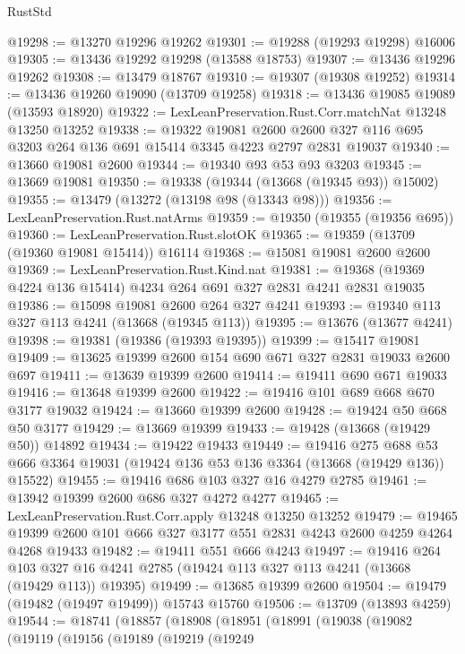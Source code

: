 \begin{lexlean}{RustStd}
\begin{coremodule}
@19298 := @13270 @19296 @19262
@19301 := @19288 (@19293 @19298) @16006
@19305 := @13436 @19292 @19298 (@13588 @18753)
@19307 := @13436 @19296 @19262
@19308 := @13479 @18767
@19310 := @19307 (@19308 @19252)
@19314 := @13436 @19260 @19090 (@13709 @19258)
@19318 := @13436 @19085 @19089 (@13593 @18920)
@19322 := LexLeanPreservation.Rust.Corr.matchNat @13248 @13250 @13252
@19338 := @19322
    @19081
    @2600
    @2600
    @327
    @116
    @695
    @3203
    @264
    @136
    @691
    @15414
    @3345
    @4223
    @2797
    @2831
    @19037
@19340 := @13660 @19081 @2600
@19344 := @19340 @93 @53 @93 @3203
@19345 := @13669 @19081
@19350 := @19338 (@19344 (@13668 (@19345 @93)) @15002)
@19355 := @13479 (@13272 (@13198 @98 (@13343 @98)))
@19356 := LexLeanPreservation.Rust.natArms
@19359 := @19350 (@19355 (@19356 @695))
@19360 := LexLeanPreservation.Rust.slotOK
@19365 := @19359 (@13709 (@19360 @19081 @15414)) @16114
@19368 := @15081 @19081 @2600 @2600
@19369 := LexLeanPreservation.Rust.Kind.nat
@19381 := @19368 (@19369 @4224 @136 @15414) @4234 @264 @691 @327 @2831 @4241 @2831 @19035
@19386 := @15098 @19081 @2600 @264 @327 @4241
@19393 := @19340 @113 @327 @113 @4241 (@13668 (@19345 @113))
@19395 := @13676 (@13677 @4241)
@19398 := @19381 (@19386 (@19393 @19395))
@19399 := @15417 @19081
@19409 := @13625 @19399 @2600 @154 @690 @671 @327 @2831 @19033 @2600 @697
@19411 := @13639 @19399 @2600
@19414 := @19411 @690 @671 @19033
@19416 := @13648 @19399 @2600
@19422 := @19416 @101 @689 @668 @670 @3177 @19032
@19424 := @13660 @19399 @2600
@19428 := @19424 @50 @668 @50 @3177
@19429 := @13669 @19399
@19433 := @19428 (@13668 (@19429 @50)) @14892
@19434 := @19422 @19433
@19449 := @19416
    @275
    @688
    @53
    @666
    @3364
    @19031
    (@19424 @136 @53 @136 @3364 (@13668 (@19429 @136)) @15522)
@19455 := @19416 @686 @103 @327 @16 @4279 @2785
@19461 := @13942 @19399 @2600 @686 @327 @4272 @4277
@19465 := LexLeanPreservation.Rust.Corr.apply @13248 @13250 @13252
@19479 := @19465 @19399 @2600 @101 @666 @327 @3177 @551 @2831 @4243 @2600 @4259 @4264 @4268 @19433
@19482 := @19411 @551 @666 @4243
@19497 := @19416
    @264
    @103
    @327
    @16
    @4241
    @2785
    (@19424 @113 @327 @113 @4241 (@13668 (@19429 @113)) @19395)
@19499 := @13685 @19399 @2600
@19504 := @19479 (@19482 (@19497 @19499)) @15743 @15760
@19506 := @13709 (@13893 @4259)
@19544 := @18741
    (@18857
      (@18908
        (@18951
          (@18991
            (@19038
              (@19082
                (@19119
                  (@19156
                    (@19189
                      (@19219
                        (@19249

\end{coremodule}
\end{lexlean}
